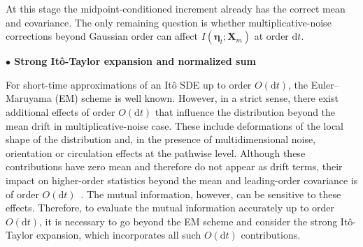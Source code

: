 At this stage the midpoint-conditioned increment already has the correct mean and covariance. The only remaining question is whether multiplicative-noise corrections beyond Gaussian order can affect $I(\bm\eta_t;\bm X_m)$ at order $\mathrm dt$.

\bigskip
\noindent\textbf{$\bullet$ Strong It\^{o}-Taylor expansion and normalized sum}

For short-time approximations of an It\^{o} SDE up to order $O(\mathrm{d}t)$, the Euler–Maruyama (EM) scheme is well known.
However, in a strict sense, there exist additional effects of order $O(\mathrm{d}t)$ that influence the distribution beyond the mean drift in multiplicative-noise case.
These include deformations of the local shape of the distribution and, in the presence of multidimensional noise, 
orientation or circulation effects at the pathwise level.
Although these contributions have zero mean and therefore do not appear as drift terms, 
their impact on higher-order statistics beyond the mean and leading-order covariance is of order $O(\mathrm{d}t)$~\cite{kloeden1992numerical,milstein1975strong}.
The mutual information, however, can be sensitive to these effects.
Therefore, to evaluate the mutual information accurately up to order $O(\mathrm{d}t)$, 
it is necessary to go beyond the EM scheme and consider the strong It\^{o}-Taylor expansion, which incorporates all such 
$O(\mathrm{d}t)$ contributions.


